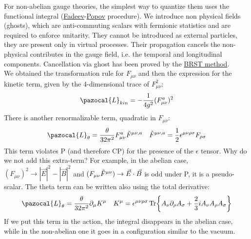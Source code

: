 \documentclass[../main.tex]{subfiles}
\begin{document}
For non-abelian gauge theories, the simplest way to quantize them uses the functional integral (\href{https://en.wikipedia.org/wiki/Ludvig_Faddeev}{Fadeev}-\href{https://en.wikipedia.org/wiki/Victor_Popov}{Popov} procedure). We introduce non physical fields (ghosts), which are anti-commuting scalars with fermionic statistics and are required to enforce unitarity. They cannot be introduced as external particles, they are present only in virtual processes. Their propagation cancels the non-physical contributes in the gauge field, i.e. the temporal and longitudinal components. Cancellation via ghost has been proved by the \href{https://en.wikipedia.org/wiki/BRST_quantization}{BRST method}.\\
We obtained the transformation rule for $F_{\mu\nu}$ and then the expression for the kinetic term, given by the 4-dimensional trace of $F_{\mu\nu}^2$:
\[
\pazocal{L}_{kin}=-\frac{1}{4g^2}(F_{\mu\nu}^a)^2
\]
There is another renormalizable term, quadratic in $F_{\mu\nu}$:
\[
\pazocal{L}_{\theta}=\frac{\theta}{32\pi^2}F_{\mu\nu}^a\Tilde{F}^{\mu\nu,a} \quad \Tilde{F}^{\mu\nu,a}=\frac{1}{2}\epsilon^{\mu\nu\rho\sigma}F_{\rho\sigma}
\]
This term violates P (and therefore CP) for the presence of the $\epsilon$ tensor. Why do we not add this extra-term? For example, in the abelian case, $(F_{\mu\nu})^2\to|\vec{E}|^2-|\vec{B}|^2$ and $(F_{\mu\nu}\Tilde{F}^{\mu\nu})\to\vec{E}\cdot\vec{B}$ is odd under P, it is a pseudo-scalar. The theta term can be written also using the total derivative: 
\[
\pazocal{L}_{\theta}=\frac{\theta}{32\pi^2}\partial_\mu K^\mu \quad K^\mu=\epsilon^{\mu\nu\rho\sigma}\Tr{A_\nu\partial_\rho A_\sigma+\frac{2}{3}iA_\nu A_\rho A_\sigma}
\]
If we put this term in the action, the integral disappears in the abelian case, while in the non-abelian one it goes in a configuration similar to the vacuum.\\
\end{document}
